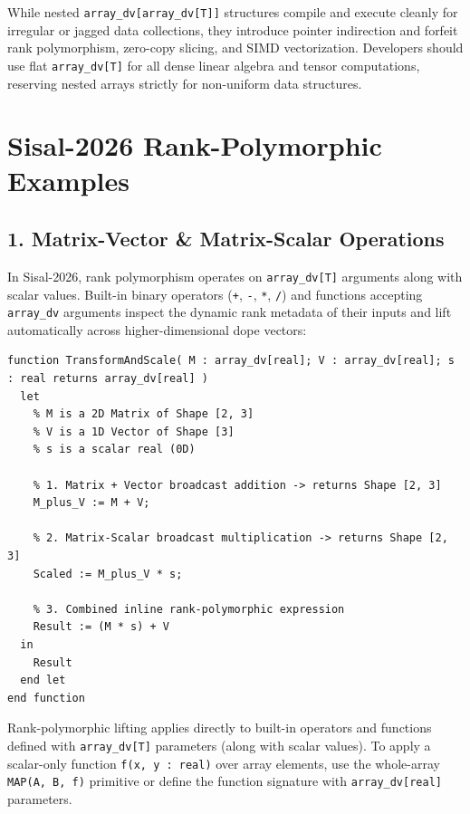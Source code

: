 \begin{warning}
While nested \texttt{array\_dv[array\_dv[T]]} structures compile and execute cleanly for irregular or jagged data collections, they introduce pointer indirection and forfeit rank polymorphism, zero-copy slicing, and SIMD vectorization. Developers should use flat \texttt{array\_dv[T]} for all dense linear algebra and tensor computations, reserving nested arrays strictly for non-uniform data structures.
\end{warning}

\section{Sisal-2026 Rank-Polymorphic Examples}

\subsection{1. Matrix-Vector \& Matrix-Scalar Operations}
In Sisal-2026, rank polymorphism operates on \texttt{array\_dv[T]} arguments along with scalar values. Built-in binary operators (\texttt{+}, \texttt{-}, \texttt{*}, \texttt{/}) and functions accepting \texttt{array\_dv} arguments inspect the dynamic rank metadata of their inputs and lift automatically across higher-dimensional dope vectors:

\begin{lstlisting}[caption={Rank-Polymorphic Matrix-Vector \& Scalar Expressions}]
function TransformAndScale( M : array_dv[real]; V : array_dv[real]; s : real returns array_dv[real] )
  let
    % M is a 2D Matrix of Shape [2, 3]
    % V is a 1D Vector of Shape [3]
    % s is a scalar real (0D)
    
    % 1. Matrix + Vector broadcast addition -> returns Shape [2, 3]
    M_plus_V := M + V;
    
    % 2. Matrix-Scalar broadcast multiplication -> returns Shape [2, 3]
    Scaled := M_plus_V * s;
    
    % 3. Combined inline rank-polymorphic expression
    Result := (M * s) + V
  in
    Result
  end let
end function
\end{lstlisting}

\begin{note}
Rank-polymorphic lifting applies directly to built-in operators and functions defined with \texttt{array\_dv[T]} parameters (along with scalar values). To apply a scalar-only function \texttt{f(x, y : real)} over array elements, use the whole-array \texttt{MAP(A, B, f)} primitive or define the function signature with \texttt{array\_dv[real]} parameters.
\end{note}

